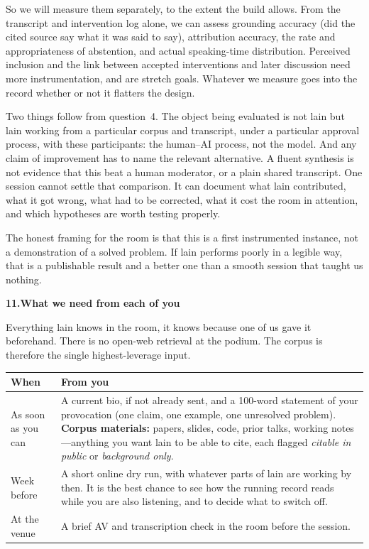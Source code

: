 \documentclass[11pt]{article}
\newcommand{\fieldlabel}[2][]{%
  \par\addvspace{1.25em}\Needspace{8\baselineskip}%
  \noindent\begin{minipage}{\linewidth}%
    {\NotoHeading\bfseries\large\color{ContentPrimary}#2}%
    \hfill{\normalfont\footnotesize\color{ContentSecondary}#1}%
  \end{minipage}\par
  \vspace{0.2em}{\color{BorderModerate}\rule{\linewidth}{0.4pt}}\par
  \vspace{0.55em}%
}
\begin{document}
So we will measure them separately, to the extent the build allows. From the
transcript and intervention log alone, we can assess grounding accuracy (did the
cited source say what it was said to say), attribution accuracy, the rate and
appropriateness of abstention, and actual speaking-time distribution. Perceived
inclusion and the link between accepted interventions and later discussion need
more instrumentation, and are stretch goals. Whatever we measure goes into the
record whether or not it flatters the design.

Two things follow from question~4. The object being evaluated is not lain but
lain working from a particular corpus and transcript, under a particular
approval process, with these participants: the human--AI process, not the model.
And any claim of improvement has to name the relevant alternative. A fluent
synthesis is not evidence that this beat a human moderator, or a plain shared
transcript. One session cannot settle that comparison. It can document what lain
contributed, what it got wrong, what had to be corrected, what it cost the room
in attention, and which hypotheses are worth testing properly.

The honest framing for the room is that this is a first instrumented instance,
not a demonstration of a solved problem. If lain performs poorly in a legible way, that is a publishable result and a better one than a smooth session
that taught us nothing.

\fieldlabel{11.\quad What we need from each of you}

Everything lain knows in the room, it knows because one of us gave it
beforehand. There is no open-web retrieval at the podium. The corpus is
therefore the single highest-leverage input.

\vspace{0.4em}
\noindent\begin{tabularx}{\linewidth}{@{}L{3.1cm}Y@{}}
\toprule
\textbf{When} & \textbf{From you} \\
\midrule
As soon as you can & A current bio, if not already sent, and a 100-word statement of your provocation (one claim, one example, one unresolved problem). \textbf{Corpus materials:} papers, slides, code, prior talks, working notes---anything you want lain to be able to cite, each flagged \emph{citable in public} or \emph{background only}. \\
\addlinespace[0.4em]
Week before & A short online dry run, with whatever parts of lain are working by then. It is the best chance to see how the running record reads while you are also listening, and to decide what to switch off. \\
\addlinespace[0.4em]
At the venue & A brief AV and transcription check in the room before the session. \\
\bottomrule
\end{tabularx}
\end{document}
